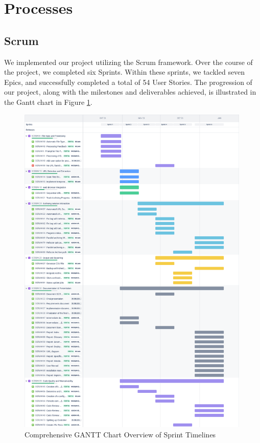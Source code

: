 \clearpage
\section{Processes}

\subsection{Scrum}
We implemented our project utilizing the Scrum framework.
Over the course of the project, we completed six \glspl{Sprint}.
Within these sprints, we tackled seven \glspl{Epic}, and successfully completed a total of 54 User Stories.
The progression of our project, along with the milestones and deliverables achieved, is illustrated in the Gantt chart in Figure \ref{fig:scrum_gantt}.

\begin{figure}[h!]
	\center
	\includegraphics[width=0.99\textwidth]{pictures/Scrum/GANTT.png}
	\caption{Comprehensive GANTT Chart Overview of Sprint Timelines}
	\label{fig:scrum_gantt}
\end{figure}

